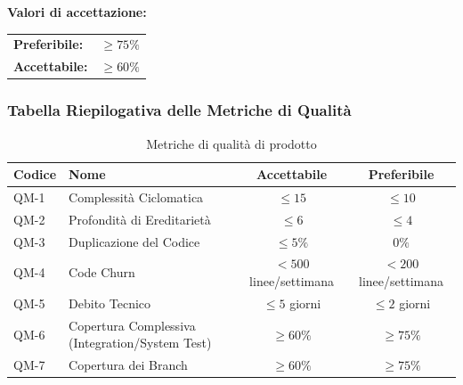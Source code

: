 \documentclass[a4paper,11pt,oneside]{scrartcl}
\begin{document}
\vspace{0.2cm}
\noindent\textbf{Valori di accettazione:}
\vspace{0.1cm}

\noindent
\begin{tabular}{@{}ll@{}}
    \textbf{Preferibile:} & $\ge 75\%$ \\
    \textbf{Accettabile:} & $\ge 60\%$ \\
\end{tabular}

\subsubsection{Tabella Riepilogativa delle Metriche di Qualità}

\begin{table}[H]
    \centering
    \renewcommand{\arraystretch}{1.3}
    \begin{tabularx}{\textwidth}{@{}p{}Xcc@{}}
        \toprule
        \textbf{Codice} & \textbf{Nome}                                   & \textbf{Accettabile}    & \textbf{Preferibile}    \\
        \midrule
        QM-1            & Complessità Ciclomatica                         & $\le 15$                & $\le 10$                \\
        QM-2            & Profondità di Ereditarietà                      & $\le 6$                 & $\le 4$                 \\
        QM-3            & Duplicazione del Codice                         & $\le 5\%$               & $0\%$                   \\
        QM-4            & Code Churn                                      & $< 500$ linee/settimana & $< 200$ linee/settimana \\
        QM-5            & Debito Tecnico                                  & $\le 5$ giorni          & $\le 2$ giorni          \\
        QM-6            & Copertura Complessiva (Integration/System Test) & $\ge 60\%$              & $\ge 75\%$              \\
        QM-7            & Copertura dei Branch                            & $\ge 60\%$              & $\ge 75\%$              \\
        \bottomrule
    \end{tabularx}
    \caption{Metriche di qualità di prodotto}
\end{table}
\end{document}
